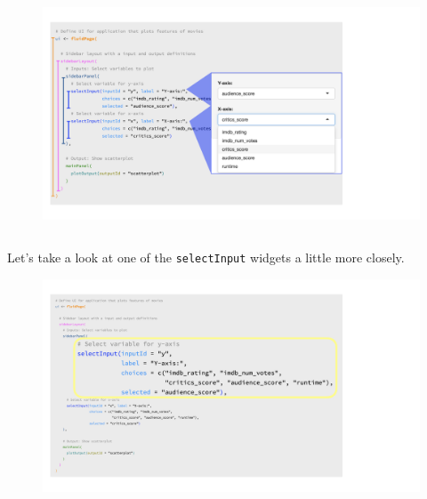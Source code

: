 \documentclass[
  letterpaper,
  DIV=11,
  numbers=noendperiod]{scrreprt}
\begin{document}
\begin{figure}

{\centering \includegraphics[width=1\textwidth,height=\textheight]{./images/input-dropdowns.png}

}

\end{figure}

\hypertarget{section-5}{%
\subsection{}\label{section-5}}

Let's take a look at one of the \texttt{selectInput} widgets a little
more closely.

\begin{figure}

{\centering \includegraphics[width=1\textwidth,height=\textheight]{./images/input-closeup.png}

}

\end{figure}
\end{document}
